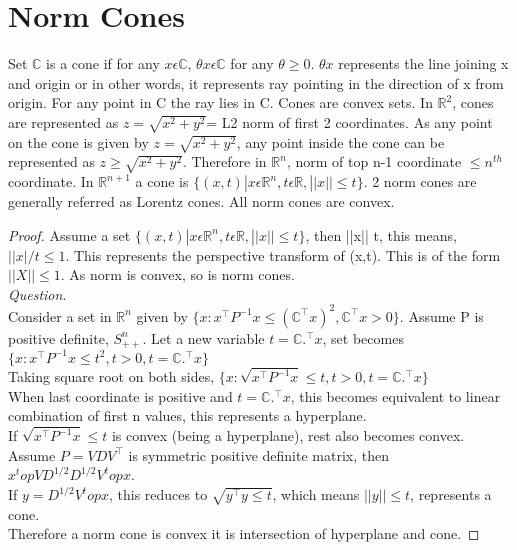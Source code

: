 \documentclass{tufte-handout}
\theoremstyle{remark}
\begin{document}
\section{Norm Cones}
Set $\mathbb{C}$ is a cone if for any  $x \epsilon \mathbb{C}$, $\theta x \epsilon \mathbb{C}$ for any $\theta \ge 0$. $\theta x$ represents the line joining x and origin or in other words, it represents ray pointing in the direction of x from origin. For any point in C the ray lies in C. Cones are convex sets.
In $\mathbb{R}^2$, cones are represented as $z=\sqrt{x^2+y^2}$= L2 norm of first 2 coordinates. As any point on the cone is given by $z=\sqrt{x^2+y^2}$, any point inside the cone can be represented as $z \ge \sqrt{x^2+y^2}$. Therefore in $\mathbb{R}^n$, norm of top n-1 coordinate $ \le  n^{th}$ coordinate. In $\mathbb{R}^{n+1}$ a cone is $\{ (x,t)| x\epsilon \mathbb{R}^{n},t\epsilon \mathbb{R},||x|| \le t\}$. 2 norm cones are generally referred as Lorentz cones. All norm cones are convex.
\begin{proof}
Assume a set $\{ (x,t)| x\epsilon \mathbb{R}^{n},t\epsilon \mathbb{R},||x|| \le t\}$, then ||x|| \le t, this means, $||x|/t \le 1$. This represents the perspective transform of (x,t). This is of the form $||X|| \le 1$. As norm is convex, so is norm cones.\\
\textit{Question}.\\
Consider a set in $\mathbb{R}^n $ given by $\{ x:x^\top P^{-1}x \le (\mathbb{C}^\top x)^2,\mathbb{C}^\top x>0\}$. Assume P is positive definite, $S_{++}^n$. Let a new variable $t= \mathbb{C}.^\top x$, set becomes $\{x:x^\top P^{-1}x \le t^2,t>0,t=\mathbb{C}.^\top x \}$\\
Taking square root on both sides,
$\{x: \sqrt{x^\top P^{-1}x}  \le t,t>0,t=\mathbb{C}.^\top x\}$\\
When last coordinate is positive and $t=\mathbb{C}.^\top x$, this becomes equivalent to linear combination of first n values, this represents a hyperplane. \\If $\sqrt{x^\top P^{-1}x}  \le t$ is convex (being a hyperplane), rest also becomes convex. Assume $P=VDV^\top$ is symmetric positive definite matrix, then $x^topVD^{1/2} D^{1/2}V^top x$.\\ If $y= D^{1/2}V^top x$, this reduces to $\sqrt{y^\top y \le t}$, which means $||y|| \le t$, represents a cone.\\ Therefore a norm cone is convex it is intersection of hyperplane and cone.
\end{proof}
\end{document}
